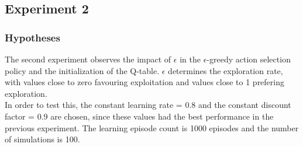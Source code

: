\documentclass[11pt]{article}
\begin{document}
\subsubsection{}

\subsection{Experiment 2}

\subsubsection{Hypotheses}
The second experiment observes the impact of $\epsilon$ in the $\epsilon$-greedy action selection policy and the initialization of the Q-table. $\epsilon$ determines the exploration rate, with values close to zero favouring exploitation and values close to 1 prefering exploration.\\
In order to test this, the constant learning rate = 0.8 and the constant discount factor = 0.9 are chosen, since these values had the best performance in the previous experiment. The learning episode count is 1000 episodes and the number of simulations is 100.
\end{document}
